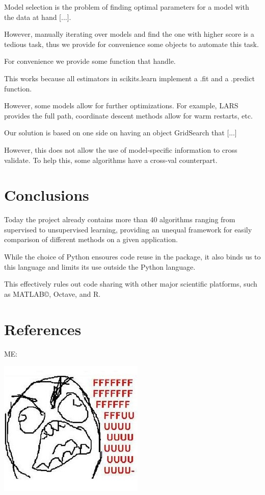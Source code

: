 \documentclass[twoside,11pt]{article}
\begin{document}
Model selection is the problem of finding optimal parameters for a
model with the data at hand [...].

However, manually iterating over models and find the one with higher
score is a tedious task, thus we provide for convenience some objects
to automate this task.



 For convenience we provide some function that handle.

This works because all estimators in scikits.learn implement a .fit
and a .predict function.


However, some models allow for further optimizations. For example,
LARS provides the full path, coordinate descent methods allow for warm
restarts, etc.


Our solution is based on one side on having an object GridSearch that
[...] 

However, this does not allow the use of model-specific information to
cross validate. To help this, some algorithms have a cross-val
counterpart.


\section{Conclusions}

Today the project already contains more than 40 algorithms ranging
from supervised to unsupervised learning, providing an unequal
framework for easily comparison of different methods on a given
application.



While the choice of Python ensoures code reuse in the package, it also
binds us to this language and limits its use outside the Python
language.

This effectively rules out code sharing with other major scientific
platforms, such as MATLAB©, Octave, and R.



\section{References}

ME:

\includegraphics{images/parafaber.jpg}
\end{document}

